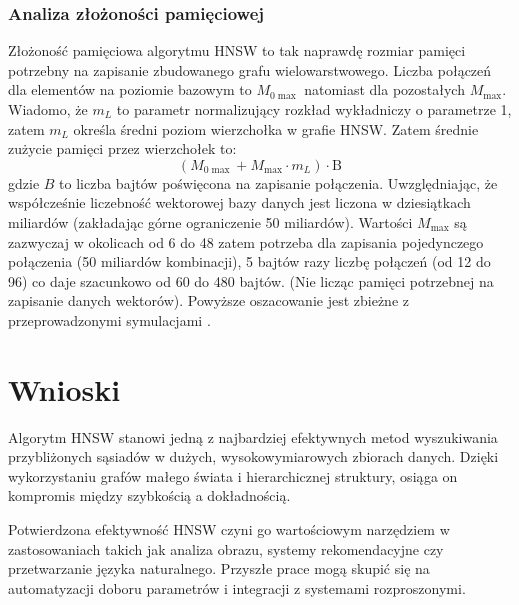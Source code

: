 \documentclass[twocolumn]{article}
\begin{document}
\subsubsection{Analiza złożoności pamięciowej}
Złożoność pamięciowa algorytmu HNSW to tak naprawdę rozmiar pamięci potrzebny na zapisanie zbudowanego grafu wielowarstwowego. Liczba połączeń dla elementów na poziomie bazowym to $M_{0 \max}$ natomiast dla pozostałych $M_{\max}$. Wiadomo, że $m_L$ to parametr normalizujący rozkład wykładniczy o parametrze 1, zatem $m_L$ określa średni poziom wierzchołka w grafie HNSW. Zatem średnie zużycie pamięci przez wierzchołek to:
\[
    (M_{0 \max} + M_{\max} \cdot m_{L}) \cdot \text{B}
\]
gdzie $B$ to liczba bajtów poświęcona na zapisanie połączenia. Uwzględniając, że współcześnie liczebność wektorowej bazy danych jest liczona w dziesiątkach miliardów (zakładając górne ograniczenie 50 miliardów). Wartości $M_{\max}$ są zazwyczaj w okolicach od 6 do 48 \cite{Malkov2016} zatem potrzeba dla zapisania pojedynczego połączenia (50 miliardów kombinacji), 5 bajtów razy liczbę połączeń (od 12 do 96) co daje szacunkowo od 60 do 480 bajtów. (Nie licząc pamięci potrzebnej na zapisanie danych wektorów). Powyższe oszacowanie jest zbieżne z przeprowadzonymi symulacjami \cite{Malkov2016}.

\section{Wnioski}

Algorytm HNSW stanowi jedną z najbardziej efektywnych metod wyszukiwania przybliżonych sąsiadów w dużych, wysokowymiarowych zbiorach danych. Dzięki wykorzystaniu grafów małego świata i hierarchicznej struktury, osiąga on kompromis między szybkością a dokładnością.

Potwierdzona efektywność HNSW czyni go wartościowym narzędziem w zastosowaniach takich jak analiza obrazu, systemy rekomendacyjne czy przetwarzanie języka naturalnego. Przyszłe prace mogą skupić się na automatyzacji doboru parametrów i integracji z systemami rozproszonymi.


\nocite{*}


\end{document}
